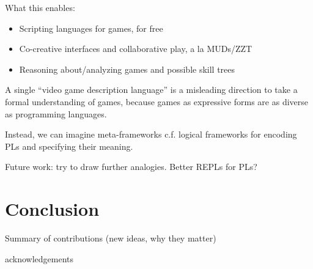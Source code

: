 \documentclass[sigconf]{acmart}
\begin{document}
  What this enables:
  \begin{itemize}
  \item Scripting languages for games, for free
  \item Co-creative interfaces and collaborative play, a la MUDs/ZZT
  \item Reasoning about/analyzing games and possible skill trees
  \end{itemize}

  A single ``video game description language'' is a misleading direction to
  take a formal understanding of games, because games as expressive forms
  are as diverse as programming languages.

  Instead, we can imagine meta-frameworks c.f. logical frameworks for
  encoding PLs and specifying their meaning.

  Future work: try to draw further analogies. Better REPLs for PLs? 

\section{Conclusion}

  Summary of contributions (new ideas, why they matter)

\begin{acks}
  acknowledgements
\end{acks}

% 
%  
\end{document}
